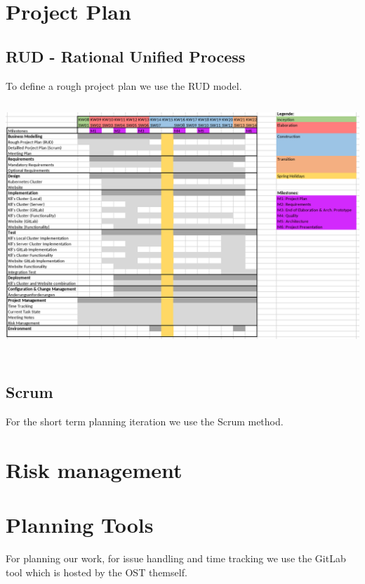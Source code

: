 \section{Project Plan}
\subsection{RUD - Rational Unified Process}
To define a rough project plan we use the RUD model. \newline
\includegraphics[height=10cm]{resources/project-plan-RUD.png}

\subsection{Scrum}
For the short term planning iteration we use the Scrum method.

\section{Risk management}


\section{Planning Tools}
For planning our work, for issue handling and time tracking we use the GitLab tool which is hosted by the OST themself.
